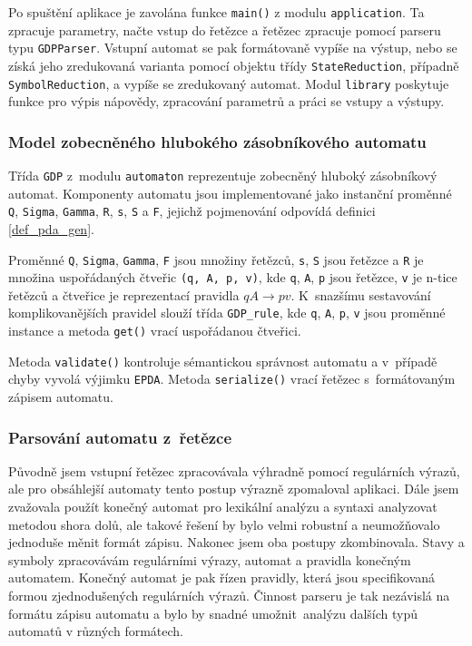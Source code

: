 Po spuštění aplikace je zavolána funkce \texttt{main()} z modulu \texttt{application}. Ta zpracuje parametry, načte vstup do řetězce a řetězec zpracuje pomocí parseru typu \texttt{GDPParser}. Vstupní automat se pak formátovaně vypíše na výstup, nebo se získá jeho zredukovaná varianta pomocí objektu třídy \texttt{StateReduction}, případně \texttt{SymbolReduction}, a vypíše se zredukovaný automat. Modul \texttt{library} poskytuje funkce pro výpis nápovědy, zpracování parametrů a práci se vstupy a výstupy.


\subsubsection{Model zobecněného hlubokého zásobníkového automatu}

Třída \texttt{GDP} z~modulu \texttt{automaton} reprezentuje zobecněný hluboký zásobníkový automat. Komponenty automatu jsou implementované jako instanční proměnné \texttt{Q}, \texttt{Sigma}, \texttt{Gamma}, \texttt{R}, \texttt{s}, \texttt{S} a \texttt{F}, jejichž pojmenování odpovídá definici \ref{def_pda_gen}. 

Proměnné \texttt{Q}, \texttt{Sigma}, \texttt{Gamma}, \texttt{F} jsou množiny řetězců, \texttt{s}, \texttt{S} jsou řetězce a \texttt{R} je množina uspořádaných čtveřic \texttt{(q, A, p, v)}, kde \texttt{q}, \texttt{A}, \texttt{p} jsou řetězce, \texttt{v} je n-tice řetězců a čtveřice je reprezentací pravidla $qA \rightarrow pv$. 
K~snazšímu sestavování komplikovanějších pravidel slouží třída \texttt{GDP\_rule}, kde \texttt{q}, \texttt{A}, \texttt{p}, \texttt{v} jsou proměnné instance a metoda \texttt{get()} vrací uspořádanou čtveřici.

Metoda \texttt{validate()} kontroluje sémantickou správnost automatu a v~případě chyby vyvolá výjimku \texttt{EPDA}. Metoda \texttt{serialize()} vrací řetězec s~formátovaným zápisem automatu.

\subsubsection{Parsování automatu z~řetězce}

Původně jsem vstupní řetězec zpracovávala výhradně pomocí regulárních výrazů, ale pro obsáhlejší automaty tento postup výrazně zpomaloval aplikaci. Dále jsem zvažovala použít konečný automat pro lexikální analýzu a syntaxi analyzovat metodou shora dolů, ale takové řešení by bylo velmi robustní a neumožňovalo jednoduše měnit formát zápisu. Nakonec jsem oba postupy zkombinovala. Stavy a symboly zpracovávám regulárními výrazy, automat a pravidla konečným automatem. Konečný automat je pak řízen pravidly, která jsou specifikovaná formou zjednodušených regulárních výrazů. Činnost parseru je tak nezávislá na formátu zápisu automatu a bylo by snadné umožnit~analýzu dalších typů automatů v různých formátech.

